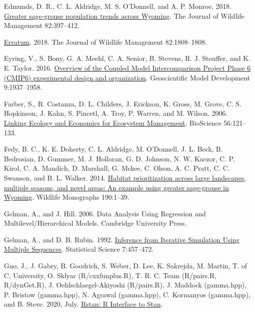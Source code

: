 \documentclass[
  12pt,
]{article}
\newlength{\cslhangindent}
\newlength{\cslentryspacingunit} %
\newenvironment{CSLReferences}[2] %
 {%
  \setlength{\parindent}{0pt}
  \ifodd #1
  \let\oldpar\par
  \def\par{\hangindent=\cslhangindent\oldpar}
  \fi
  \setlength{\parskip}{#2\cslentryspacingunit}
 }%
 {}
\begin{document}
\begin{CSLReferences}{1}{0}
\leavevmode{}%
Edmunds, D. R., C. L. Aldridge, M. S. O'Donnell, and A. P. Monroe. 2018. \href{https://doi.org/10.1002/jwmg.21386}{Greater sage-grouse population trends across {Wyoming}}. The Journal of Wildlife Management 82:397--412.

\leavevmode{}%
\href{https://doi.org/10.1002/jwmg.21560}{Erratum}. 2018. The Journal of Wildlife Management 82:1808--1808.

\leavevmode{}%
Eyring, V., S. Bony, G. A. Meehl, C. A. Senior, B. Stevens, R. J. Stouffer, and K. E. Taylor. 2016. \href{https://doi.org/10.5194/gmd-9-1937-2016}{Overview of the {Coupled} {Model} {Intercomparison} {Project} {Phase} 6 ({CMIP6}) experimental design and organization}. Geoscientific Model Development 9:1937--1958.

\leavevmode{}%
Farber, S., R. Costanza, D. L. Childers, J. Erickson, K. Gross, M. Grove, C. S. Hopkinson, J. Kahn, S. Pincetl, A. Troy, P. Warren, and M. Wilson. 2006. \href{https://doi.org/10.1641/0006-3568(2006)056\%5B0121:LEAEFE\%5D2.0.CO;2}{Linking {Ecology} and {Economics} for {Ecosystem} {Management}}. BioScience 56:121--133.

\leavevmode{}%
Fedy, B. C., K. E. Doherty, C. L. Aldridge, M. O'Donnell, J. L. Beck, B. Bedrosian, D. Gummer, M. J. Holloran, G. D. Johnson, N. W. Kaczor, C. P. Kirol, C. A. Mandich, D. Marshall, G. Mckee, C. Olson, A. C. Pratt, C. C. Swanson, and B. L. Walker. 2014. \href{https://doi.org/10.1002/wmon.1014}{Habitat prioritization across large landscapes, multiple seasons, and novel areas: {An} example using greater sage-grouse in {Wyoming}}. Wildlife Monographs 190:1--39.

\leavevmode{}%
Gelman, A., and J. Hill. 2006. Data {Analysis} {Using} {Regression} and {Multilevel}/{Hierarchical} {Models}. Cambridge University Press.

\leavevmode{}%
Gelman, A., and D. B. Rubin. 1992. \href{https://doi.org/10.1214/ss/1177011136}{Inference from {Iterative} {Simulation} {Using} {Multiple} {Sequences}}. Statistical Science 7:457--472.

\leavevmode{}%
Guo, J., J. Gabry, B. Goodrich, S. Weber, D. Lee, K. Sakrejda, M. Martin, T. of C. University, O. Sklyar (R/cxxfunplus.R), T. R. C. Team (R/pairs.R, R/dynGet.R), J. Oehlschlaegel-Akiyoshi (R/pairs.R), J. Maddock (gamma.hpp), P. Bristow (gamma.hpp), N. Agrawal (gamma.hpp), C. Kormanyos (gamma.hpp), and B. Steve. 2020, July. \href{https://CRAN.R-project.org/package=rstan}{Rstan: {R} {Interface} to {Stan}}.


\end{CSLReferences}
\end{document}
